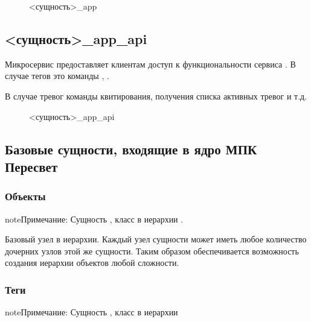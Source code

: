 \documentclass[a4paper,10pt,russian]{sphinxmanual}
\begin{document}
\begin{figure}[htbp]
\centering
\capstart

\noindent{}
\caption{\textless{}сущность\textgreater{}\_app}\label{\detokenize{architecture:id26}}\end{figure}


\subsection{\textless{}сущность\textgreater{}\_app\_api}
\label{\detokenize{architecture:app-api}}
\sphinxAtStartPar
Микросервис предоставляет клиентам доступ к функциональности сервиса
. В случае тегов \sphinxhyphen{} это команды , .

\sphinxAtStartPar
В случае тревог \sphinxhyphen{} команды квитирования, получения списка активных тревог и
т.д.

\begin{figure}[htbp]
\centering
\capstart

\noindent{}
\caption{\textless{}сущность\textgreater{}\_app\_api}\label{\detokenize{architecture:id27}}\end{figure}


\subsection{Базовые сущности, входящие в ядро МПК Пересвет}
\label{\detokenize{architecture:id5}}

\subsubsection{Объекты}
\label{\detokenize{architecture:id6}}
\begin{sphinxadmonition}{note}{Примечание:}
\sphinxAtStartPar
Сущность , класс в иерархии .
\end{sphinxadmonition}

\sphinxAtStartPar
Базовый узел в иерархии. Каждый узел сущности  может иметь
любое количество дочерних узлов этой же сущности. Таким образом обеспечивается
возможность создания иерархии объектов любой сложности.


\subsubsection{Теги}
\label{\detokenize{architecture:id7}}
\begin{sphinxadmonition}{note}{Примечание:}
\sphinxAtStartPar
Сущность , класс в иерархии 
\end{sphinxadmonition}
\end{document}
